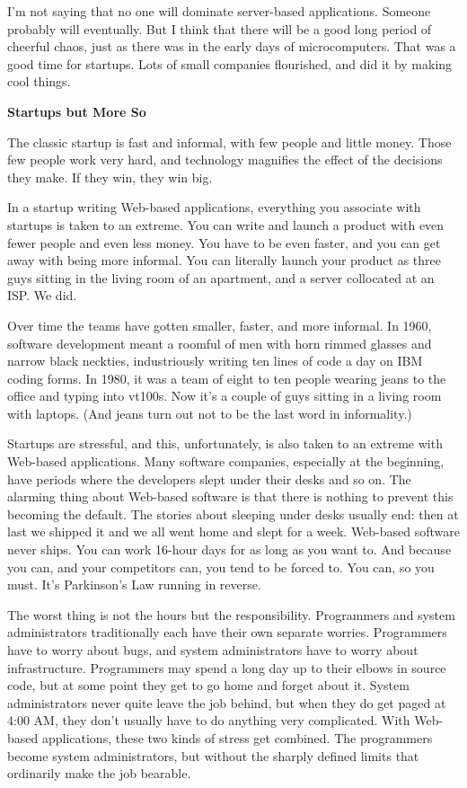 \documentclass[12pt]{book}
\begin{document}
I'm not saying that no one will dominate server-based applications.
Someone probably will eventually. But I think that there will be a good
long period of cheerful chaos, just as there was in the early days of
microcomputers. That was a good time for startups. Lots of small
companies flourished, and did it by making cool things.

\textbf{Startups but More So}

The classic startup is fast and informal, with few people and little
money. Those few people work very hard, and technology magnifies the
effect of the decisions they make. If they win, they win big.

In a startup writing Web-based applications, everything you associate
with startups is taken to an extreme. You can write and launch a product
with even fewer people and even less money. You have to be even faster,
and you can get away with being more informal. You can literally launch
your product as three guys sitting in the living room of an apartment,
and a server collocated at an ISP. We did.

Over time the teams have gotten smaller, faster, and more informal. In
1960, software development meant a roomful of men with horn rimmed
glasses and narrow black neckties, industriously writing ten lines of
code a day on IBM coding forms. In 1980, it was a team of eight to ten
people wearing jeans to the office and typing into vt100s. Now it's a
couple of guys sitting in a living room with laptops. (And jeans turn
out not to be the last word in informality.)

Startups are stressful, and this, unfortunately, is also taken to an
extreme with Web-based applications. Many software companies, especially
at the beginning, have periods where the developers slept under their
desks and so on. The alarming thing about Web-based software is that
there is nothing to prevent this becoming the default. The stories about
sleeping under desks usually end: then at last we shipped it and we all
went home and slept for a week. Web-based software never ships. You can
work 16-hour days for as long as you want to. And because you can, and
your competitors can, you tend to be forced to. You can, so you must.
It's Parkinson's Law running in reverse.

The worst thing is not the hours but the responsibility. Programmers and
system administrators traditionally each have their own separate
worries. Programmers have to worry about bugs, and system administrators
have to worry about infrastructure. Programmers may spend a long day up
to their elbows in source code, but at some point they get to go home
and forget about it. System administrators never quite leave the job
behind, but when they do get paged at 4:00 AM, they don't usually have
to do anything very complicated. With Web-based applications, these two
kinds of stress get combined. The programmers become system
administrators, but without the sharply defined limits that ordinarily
make the job bearable.
\end{document}
